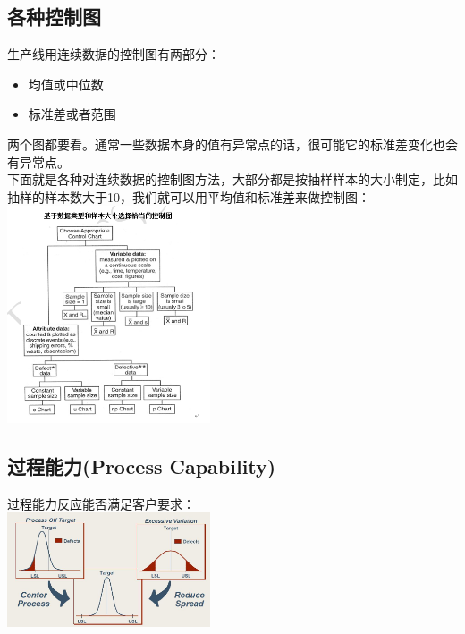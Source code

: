 \hypertarget{ux5404ux79cdux63a7ux5236ux56fe}{%
\subsection{各种控制图}\label{ux5404ux79cdux63a7ux5236ux56fe}}

生产线用连续数据的控制图有两部分：

\begin{itemize}
\tightlist
\item
  均值或中位数
\item
  标准差或者范围
\end{itemize}

两个图都要看。通常一些数据本身的值有异常点的话，很可能它的标准差变化也会有异常点。\\
下面就是各种对连续数据的控制图方法，大部分都是按抽样样本的大小制定，比如抽样的样本数大于10，我们就可以用平均值和标准差来做控制图：\\

\includegraphics[width=6cm]{控制图01.png}

\hypertarget{ux8fc7ux7a0bux80fdux529bprocess-capability-1}{%
\subsection{过程能力(Process
Capability)}\label{ux8fc7ux7a0bux80fdux529bprocess-capability-1}}

过程能力反应能否满足客户要求：\\

\includegraphics[width=6cm]{DAD_p9.jpg}

